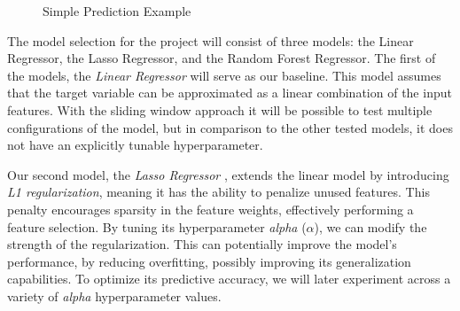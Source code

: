 \documentclass[12pt]{report} %
\begin{document}
\begin{figure}[H]
    \centering
    \caption{Simple Prediction Example}
    \label{fig:pred_example}
\end{figure}

The model selection for the project will consist of three models: the Linear Regressor, the Lasso Regressor, and the Random Forest Regressor. The first of the models, the \textit{Linear Regressor} \cite{linear_regression} will serve as our baseline. This model assumes that the target variable can be approximated as a linear combination of the input features. With the sliding window approach it will be possible to test multiple configurations of the model, but in comparison to the other tested models, it does not have an explicitly tunable hyperparameter.

Our second model, the \textit{Lasso Regressor} \cite{lasso_regression}, extends the linear model by introducing \textit{L1 regularization}, meaning it has the ability to penalize unused features. This penalty encourages sparsity in the feature weights, effectively performing a feature selection. By tuning its hyperparameter \textit{alpha} ($\alpha$), we can modify the strength of the regularization. This can potentially improve the model's performance, by reducing overfitting, possibly improving its generalization capabilities. To optimize its predictive accuracy, we will later experiment across a variety of \textit{alpha} hyperparameter values.
\end{document}
